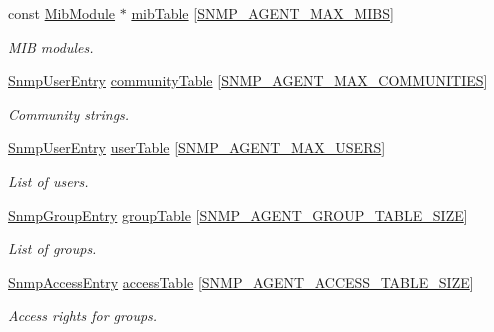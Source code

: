 \begin{DoxyCompactItemize}
const \hyperlink{structMibModule}{Mib\+Module} $\ast$ \hyperlink{struct__SnmpAgentContext_acd71162ff8fc9d9ac890f6b425d48a88}{mib\+Table} \mbox{[}\hyperlink{snmp__agent_8h_a5d367250fd498e757229b7ab62c3121a}{S\+N\+M\+P\+\_\+\+A\+G\+E\+N\+T\+\_\+\+M\+A\+X\+\_\+\+M\+I\+BS}\mbox{]}
\begin{DoxyCompactList}\small\item\em M\+IB modules. \end{DoxyCompactList}\item 
\hyperlink{structSnmpUserEntry}{Snmp\+User\+Entry} \hyperlink{struct__SnmpAgentContext_ab0899e404ea599ac625bb312e7ae3f0a}{community\+Table} \mbox{[}\hyperlink{snmp__agent_8h_ad8464259eef69f485dbcd8c5085a58e8}{S\+N\+M\+P\+\_\+\+A\+G\+E\+N\+T\+\_\+\+M\+A\+X\+\_\+\+C\+O\+M\+M\+U\+N\+I\+T\+I\+ES}\mbox{]}
\begin{DoxyCompactList}\small\item\em Community strings. \end{DoxyCompactList}\item 
\hyperlink{structSnmpUserEntry}{Snmp\+User\+Entry} \hyperlink{struct__SnmpAgentContext_a6c1f41a6c7fa82b33ab73b31197e2036}{user\+Table} \mbox{[}\hyperlink{snmp__agent_8h_a87620bd88babef997647226c78f35ecb}{S\+N\+M\+P\+\_\+\+A\+G\+E\+N\+T\+\_\+\+M\+A\+X\+\_\+\+U\+S\+E\+RS}\mbox{]}
\begin{DoxyCompactList}\small\item\em List of users. \end{DoxyCompactList}\item 
\hyperlink{structSnmpGroupEntry}{Snmp\+Group\+Entry} \hyperlink{struct__SnmpAgentContext_ae50091d42d74d105d77924e5c1e6a3df}{group\+Table} \mbox{[}\hyperlink{snmp__agent_8h_a51c46973cabcfc46d84b0dbeb9365752}{S\+N\+M\+P\+\_\+\+A\+G\+E\+N\+T\+\_\+\+G\+R\+O\+U\+P\+\_\+\+T\+A\+B\+L\+E\+\_\+\+S\+I\+ZE}\mbox{]}
\begin{DoxyCompactList}\small\item\em List of groups. \end{DoxyCompactList}\item 
\hyperlink{structSnmpAccessEntry}{Snmp\+Access\+Entry} \hyperlink{struct__SnmpAgentContext_a10b237ee97cc0109689597d6d3c0a95e}{access\+Table} \mbox{[}\hyperlink{snmp__agent_8h_a8fbe14dcee7eac378b325a34dd7ea056}{S\+N\+M\+P\+\_\+\+A\+G\+E\+N\+T\+\_\+\+A\+C\+C\+E\+S\+S\+\_\+\+T\+A\+B\+L\+E\+\_\+\+S\+I\+ZE}\mbox{]}
\begin{DoxyCompactList}\small\item\em Access rights for groups. \end{DoxyCompactList}\item 

\end{DoxyCompactItemize}
